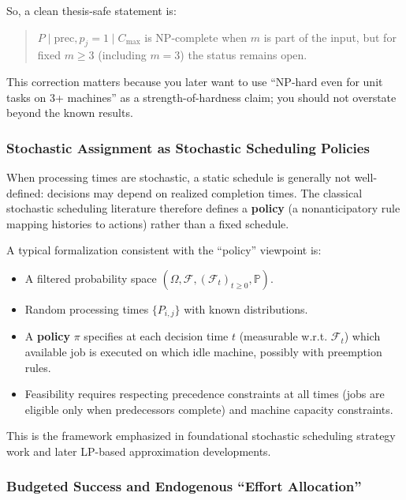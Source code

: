So, a clean thesis-safe statement is:

\begin{quote}
\(P\mid \mathrm{prec}, p_j=1\mid C_{\max}\) is NP-complete when \(m\) is part of the input, but for fixed \(m\ge 3\) (including \(m=3\)) the status remains open.
\end{quote}

This correction matters because you later want to use ``NP-hard even for unit tasks on 3+ machines'' as a strength-of-hardness claim; you should not overstate beyond the known results.

\subsubsection{Stochastic Assignment as Stochastic Scheduling Policies}

When processing times are stochastic, a static schedule is generally not well-defined: decisions may depend on realized completion times. The classical stochastic scheduling literature therefore defines a \textbf{policy} (a nonanticipatory rule mapping histories to actions) rather than a fixed schedule.

A typical formalization consistent with the ``policy'' viewpoint is:

\begin{itemize}
\item A filtered probability space \((\Omega,\mathcal{F},(\mathcal{F}_t)_{t\ge 0},\mathbb{P})\).
\item Random processing times \(\{P_{i,j}\}\) with known distributions.
\item A \textbf{policy} \(\pi\) specifies at each decision time \(t\) (measurable w.r.t. \(\mathcal{F}_t\)) which available job is executed on which idle machine, possibly with preemption rules.
\item Feasibility requires respecting precedence constraints at all times (jobs are eligible only when predecessors complete) and machine capacity constraints.
\end{itemize}

This is the framework emphasized in foundational stochastic scheduling strategy work and later LP-based approximation developments.

\subsubsection{Budgeted Success and Endogenous ``Effort Allocation''}

